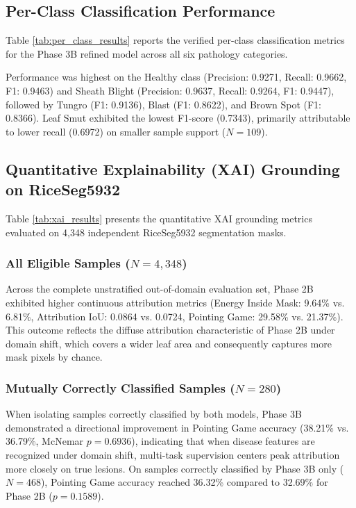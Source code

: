 \subsection{Per-Class Classification Performance}
Table \ref{tab:per_class_results} reports the verified per-class classification metrics for the Phase 3B refined model across all six pathology categories.

Performance was highest on the Healthy class (Precision: 0.9271, Recall: 0.9662, F1: 0.9463) and Sheath Blight (Precision: 0.9637, Recall: 0.9264, F1: 0.9447), followed by Tungro (F1: 0.9136), Blast (F1: 0.8622), and Brown Spot (F1: 0.8366). Leaf Smut exhibited the lowest F1-score (0.7343), primarily attributable to lower recall (0.6972) on smaller sample support ($N=109$).

\subsection{Quantitative Explainability (XAI) Grounding on RiceSeg5932}
Table \ref{tab:xai_results} presents the quantitative XAI grounding metrics evaluated on 4,348 independent RiceSeg5932 segmentation masks.

\subsubsection{All Eligible Samples ($N=4,348$)}
Across the complete unstratified out-of-domain evaluation set, Phase 2B exhibited higher continuous attribution metrics (Energy Inside Mask: 9.64\% vs. 6.81\%, Attribution IoU: 0.0864 vs. 0.0724, Pointing Game: 29.58\% vs. 21.37\%). This outcome reflects the diffuse attribution characteristic of Phase 2B under domain shift, which covers a wider leaf area and consequently captures more mask pixels by chance.

\subsubsection{Mutually Correctly Classified Samples ($N=280$)}
When isolating samples correctly classified by both models, Phase 3B demonstrated a directional improvement in Pointing Game accuracy (38.21\% vs. 36.79\%, McNemar $p = 0.6936$), indicating that when disease features are recognized under domain shift, multi-task supervision centers peak attribution more closely on true lesions. On samples correctly classified by Phase 3B only ($N=468$), Pointing Game accuracy reached 36.32\% compared to 32.69\% for Phase 2B ($p = 0.1589$).

